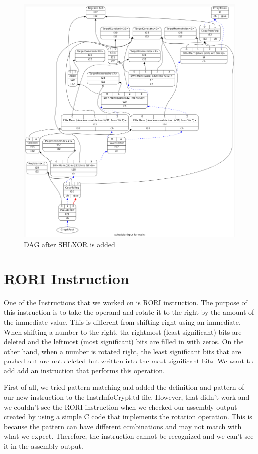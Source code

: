 \begin{figure}[h!]
    \centering
    \includegraphics[scale= 0.3]{adding_new_instr/shlxor_after.png}
    \caption{DAG after SHLXOR is added}
    \label{fig:shlxor_after}
\end{figure}

\section{RORI Instruction}
One of the Instructions that we worked on is RORI instruction. The purpose of this instruction is to take the operand and rotate it to the right by the amount of the immediate value. This is different from shifting right using an immediate. When shifting a number to the right, the rightmost (least significant) bits are deleted and the leftmost (most significant) bits are filled in with zeros. On the other hand, when a number is rotated right, the least significant bits that are pushed out are not deleted but written into the most significant bits. We want to add add an instruction that performs this operation.

First of all, we tried pattern matching and added the definition and pattern of our new instruction to the InstrInfoCrypt.td file. However, that didn’t work and we couldn’t see the RORI instruction when we checked our assembly output created by using a simple C code that implements the rotation operation. This is because the pattern can have different combinations and may not match with what we expect. Therefore, the instruction cannot be recognized and we can’t see it in the assembly output.


